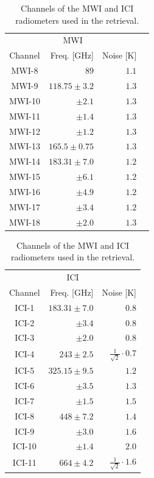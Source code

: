\documentclass[journal abbreviation, manuscript]{copernicus}
\providecommand{\DIFaddbeginFL}{} %
\providecommand{\DIFaddendFL}{} %
\providecommand{\DIFdelbeginFL}{} %
\providecommand{\DIFdelendFL}{} %
\begin{document}
\begin{table}[hbpt]
\caption{Channels of the MWI and ICI radiometers used in the retrieval.}
\label{tab:channels}
    \DIFdelbeginFL %
\DIFdelendFL \DIFaddbeginFL \begin{tabular}{c|r|r|p{2cm}}
    \DIFaddendFL \multicolumn{3}{c}{MWI}\\
    Channel & Freq. [GHz] & Noise [K] \\
    \hline
    MWI-8  & $89$              & $1.1$ \\
    MWI-9  & $118.75 \pm 3.2$  & $1.3$ \\
    MWI-10 & $\pm 2.1$         & $1.3$ \\
    MWI-11 & $\pm 1.4$         & $1.3$ \\
    MWI-12 & $\pm 1.2$         & $1.3$ \\
    MWI-13 & $165.5 \pm 0.75$  & $1.3$ \\
    MWI-14 & $183.31 \pm 7.0$  & $1.2$ \\
    MWI-15 & $ \pm 6.1$        & $1.2$ \\
    MWI-16 & $ \pm 4.9$        & $1.2$ \\
    MWI-17 & $ \pm 3.4$        & $1.2$ \\
    MWI-18 & $ \pm 2.0$        & $1.3$ \\
    \end{tabular}%
    \hspace{1cm}%
    \begin{tabular}{c|r|r}
    \multicolumn{3}{c}{ICI}\\
    Channel & Freq. [GHz] & Noise [K]  \\
    \hline
    ICI-1  & $183.31 \pm 7.0$ & $0.8$ \\
    ICI-2  & $       \pm 3.4$ & $0.8$ \\
    ICI-3  & $       \pm 2.0$ & $0.8$ \\
    ICI-4  & $243    \pm 2.5$ & $\frac{1}{\sqrt{2}} \cdot 0.7$ \\
    ICI-5  & $325.15 \pm 9.5$ & $1.2$ \\
    ICI-6  & $       \pm 3.5$ & $1.3$ \\
    ICI-7  & $       \pm 1.5$ & $1.5$ \\
    ICI-8  & $448    \pm 7.2$ & $1.4$ \\
    ICI-9  & $       \pm 3.0$ & $1.6$ \\
    ICI-10 & $       \pm 1.4$ & $2.0$ \\
    ICI-11 & $664    \pm 4.2$ & $\frac{1}{\sqrt{2}} \cdot 1.6$ \\
    \end{tabular}
\end{table}
\end{document}
